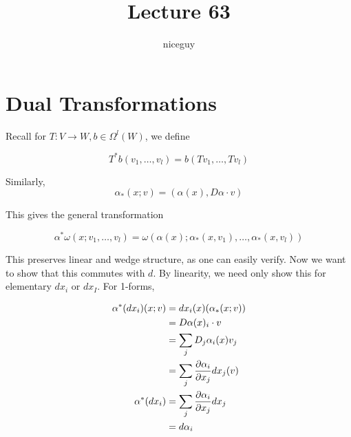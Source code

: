 \documentclass[12pt]{article}
\title{Lecture 63}
\author{niceguy}
\begin{document}
\maketitle

\section{Dual Transformations}

Recall for $T:V\rightarrow W, b \in \Omega^l(W)$, we define

$$T^*b(v_1,\dots,v_l) = b(Tv_1,\dots,Tv_l)$$

Similarly,
$$\alpha_*(x;v) = (\alpha(x),D\alpha\cdot v)$$

This gives the general transformation

$$\alpha^*\omega(x;v_1,\dots,v_l) = \omega(\alpha(x);\alpha_*(x,v_1),\dots,\alpha_*(x,v_l))$$

This preserves linear and wedge structure, as one can easily verify. Now we want to show that this commutes with $d$. By linearity, we need only show this for elementary $dx_i$ or $dx_I$. For 1-forms,

\begin{align*}
    \alpha^*(dx_i)(x;v) &= dx_i(x)(\alpha_*(x;v)) \\
                        &= D\alpha(x)_i\cdot v \\
                        &= \sum_j D_j\alpha_i(x)v_j \\
                        &= \sum_j \frac{\partial \alpha_i}{\partial x_j}dx_j(v) \\
    \alpha^*(dx_i) &= \sum_j \frac{\partial \alpha_i}{\partial x_j}dx_j \\
                   &= d\alpha_i
\end{align*}
\end{document}
